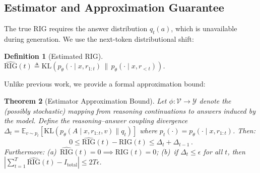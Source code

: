 \documentclass{article}
\newtheorem{theorem}{Theorem}
\newtheorem{definition}[theorem]{Definition}
\newcommand{\E}{\mathbb{E}}
\newcommand{\cY}{\mathcal{Y}}
\newcommand{\cV}{\mathcal{V}}
\newcommand{\RIG}{\mathrm{RIG}}
\newcommand{\Itotal}{I_{\mathrm{total}}}
\newcommand{\KL}{\mathrm{KL}}
\begin{document}
\subsection{Estimator and Approximation Guarantee}
\label{sec:estimator}

The true RIG requires the answer distribution $q_t(a)$, which is unavailable during generation. We use the next-token distributional shift:

\begin{definition}[Estimated RIG]
\label{def:rig_hat}
$\widehat{\RIG}(t) \triangleq \KL\!\left( p_\theta(\cdot \mid x, r_{1:t}) \,\|\, p_\theta(\cdot \mid x, r_{<t}) \right)$.
\end{definition}

Unlike previous work, we provide a formal approximation bound:

\begin{theorem}[Estimator Approximation Bound]
\label{thm:estimator_gap}
Let $\phi: \cV \to \cY$ denote the (possibly stochastic) mapping from reasoning continuations to answers induced by the model. Define the \emph{reasoning--answer coupling divergence} $\Delta_t = \E_{v \sim p_t}[\KL(p_\theta(A \mid x, r_{1:t}, v) \| q_t)]$ where $p_t(\cdot) = p_\theta(\cdot \mid x, r_{1:t})$. Then:
\begin{equation}
    0 \leq \widehat{\RIG}(t) - \RIG(t) \leq \Delta_t + \Delta_{t-1}\,.
    \label{eq:estimator_gap}
\end{equation}
Furthermore: (a)~$\widehat{\RIG}(t) = 0 \implies \RIG(t) = 0$; (b)~if $\Delta_t \leq \epsilon$ for all $t$, then $|\sum_{t=1}^T \widehat{\RIG}(t) - \Itotal| \leq 2T\epsilon$.
\end{theorem}
\end{document}
